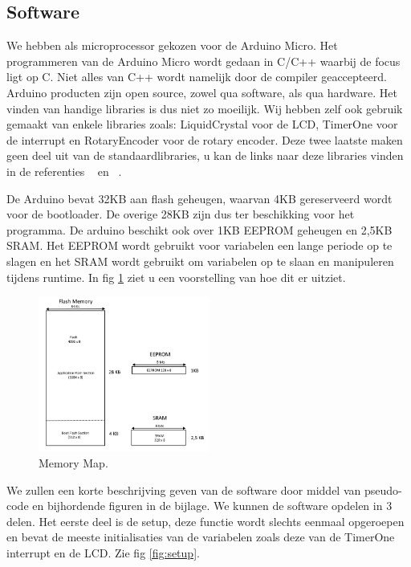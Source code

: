 \documentclass[a4paper,dutch]{article}
\begin{document}
\subsection{Software}

We hebben als microprocessor gekozen voor de Arduino Micro. 
Het programmeren van de Arduino Micro wordt gedaan in C/C++ waarbij de focus ligt op C. Niet alles van C++ wordt namelijk door de compiler geaccepteerd. Arduino producten zijn open source, zowel qua software, als qua hardware. Het vinden van handige libraries is dus niet zo moeilijk. Wij hebben zelf ook gebruik gemaakt van enkele libraries zoals: LiquidCrystal voor de LCD, TimerOne voor de interrupt en RotaryEncoder voor de rotary encoder. Deze twee laatste maken geen deel uit van de standaardlibraries, u kan de links naar deze libraries vinden in de referenties ~\cite{Github:TimerOne} en ~\cite{mathertel:RotaryEncoder}. 

De Arduino bevat 32KB aan flash geheugen, waarvan 4KB gereserveerd wordt voor de bootloader. De overige 28KB zijn dus ter beschikking voor het programma. De arduino beschikt ook over 1KB EEPROM geheugen en 2,5KB SRAM. Het EEPROM wordt gebruikt voor variabelen een lange periode op te slagen en het SRAM wordt gebruikt om variabelen op te slaan en manipuleren tijdens runtime. In fig \ref{fig:memory map} ziet u een voorstelling van hoe dit er uitziet. 

\begin{figure}[H]
\centering
\includegraphics[width=0.5\textwidth]{Memory_Map.png}
\caption{\label{fig:memory map}Memory Map.}
\end{figure}

We zullen een korte beschrijving geven van de software door middel van pseudo-code en bijhordende figuren in de bijlage. We kunnen de software opdelen in 3 delen. Het eerste deel is de setup, deze functie wordt slechts eenmaal opgeroepen en bevat de meeste initialisaties van de variabelen zoals deze van de TimerOne interrupt en de LCD. Zie fig \ref{fig:setup}.
\end{document}
